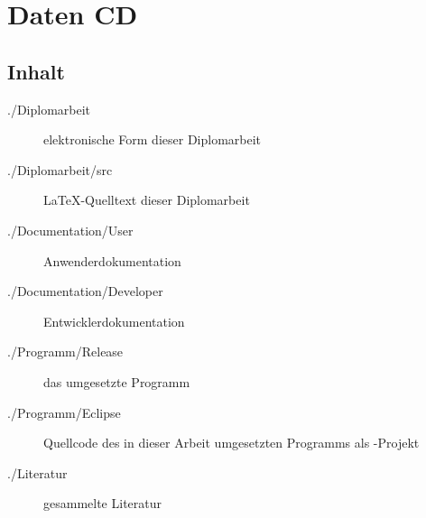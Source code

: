 \chapter{Daten CD}

\section*{Inhalt}


\begin{description}
	\item[./Diplomarbeit] elektronische Form dieser Diplomarbeit
	\item[./Diplomarbeit/src] \LaTeX -Quelltext dieser Diplomarbeit
	\item[./Documentation/User] Anwenderdokumentation
	\item[./Documentation/Developer] Entwicklerdokumentation
	\item[./Programm/Release] das umgesetzte Programm
	\item[./Programm/Eclipse] Quellcode des in dieser Arbeit umgesetzten Programms als \eclipseNS -Projekt
	\item[./Literatur] gesammelte Literatur
\end{description}

